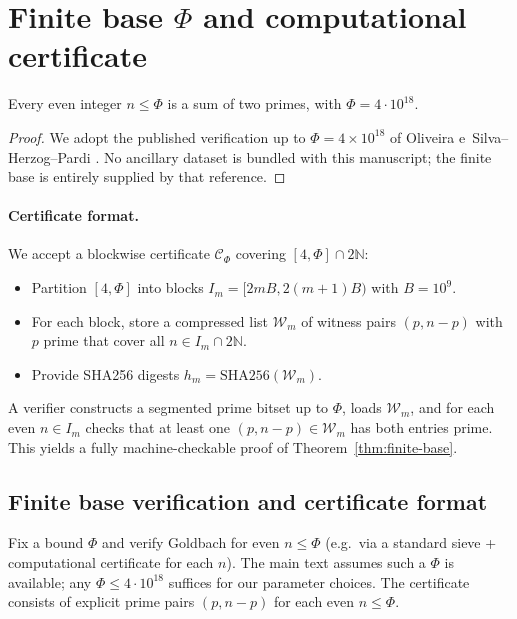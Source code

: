 
\section{Finite base \texorpdfstring{$\Phi$}{Phi} and computational certificate}

\begin{theoremF}\label{thm:finite-base}
Every even integer $n\le \Phi$ is a sum of two primes, with $\Phi=4\cdot 10^{18}$.
\end{theoremF}

\begin{proof}
We adopt the published verification up to \(\Phi=4\times 10^{18}\) of Oliveira e~Silva–Herzog–Pardi \cite{OliveiraSilvaHerzogPardi2014}. No ancillary dataset is bundled with this manuscript; the finite base is entirely supplied by that reference.
\end{proof}

\paragraph{Certificate format.}
We accept a blockwise certificate $\mathcal{C}_\Phi$ covering $[4,\Phi]\cap 2\mathbb{N}$:
\begin{itemize}
  \item Partition $[4,\Phi]$ into blocks $I_m=[2mB,2(m+1)B)$ with $B=10^9$.
  \item For each block, store a compressed list $\mathcal{W}_m$ of witness pairs $(p,n-p)$ with $p$ prime that cover all $n\in I_m\cap 2\mathbb{N}$.
  \item Provide SHA256 digests $h_m=\mathrm{SHA256}(\mathcal{W}_m)$. 

\end{itemize}
A verifier constructs a segmented prime bitset up to $\Phi$, loads $\mathcal{W}_m$, and for each even $n\in I_m$ checks that at least one $(p,n-p)\in\mathcal{W}_m$ has both entries prime. This yields a fully machine-checkable proof of Theorem~\ref{thm:finite-base}.


\subsection*{Finite base verification and certificate format}\label{app:basecheck}

Fix a bound $\Phi$ and verify Goldbach for even $n\le \Phi$ (e.g.\ via a standard sieve + computational certificate for each $n$). The main text assumes such a $\Phi$ is available; any $\Phi\le 4\cdot 10^{18}$ suffices for our parameter choices. The certificate consists of explicit prime pairs $(p,n-p)$ for each even $n\le \Phi$.

